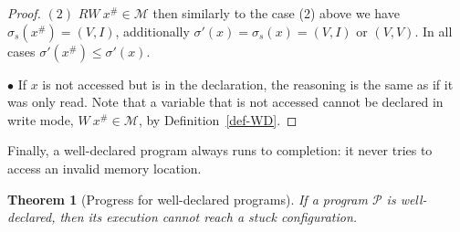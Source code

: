 \documentclass[preprint,12pt]{elsarticle}
\newtheorem{Theorem}{Theorem}
\newcommand{\abs}[1]{#1^\#}
\newcommand{\AM}{\mathcal{M}}
\newcommand{\Prog}{\mathcal{P}}
\begin{document}
\begin{proof}
\noindent$(2)$ $RW~\abs x \in \AM$ then similarly to the case (2) above we have 
$\sigma_s(\abs x)=(V,I)$, additionally $\sigma'(x)=\sigma_s(x)=(V,I)$ or $(V,V)$. In all 
cases $\sigma'(\abs x)\leq\sigma'(x)$.

\noindent$\bullet$ If  $x$ is not accessed but is in the declaration, the 
reasoning is the same as if it was only read. 
Note that a variable that is not accessed cannot be declared 
in write mode, $W~\abs x \in \AM$, by
Definition~\ref{def-WD}.
\end{proof}

Finally, a well-declared program always runs to completion: it never tries to access an 
invalid memory location.

\begin{Theorem}[Progress for well-declared programs]\label{thm-progress}
If a program $\Prog$ is well-declared, then its execution cannot reach a stuck 
configuration.
\end{Theorem}
\end{document}
